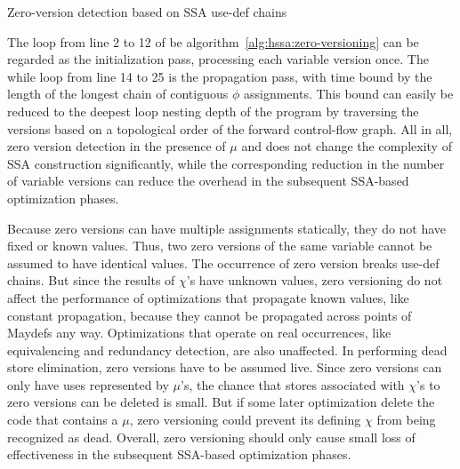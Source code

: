 \begin{algorithm}[htpb]
  \caption{\label{alg:hssa:zero-versioning}Zero-version detection based on SSA use-def chains}
\end{algorithm}

The loop from line 2 to 12 of be
algorithm~\ref{alg:hssa:zero-versioning} can be regarded as the initialization
pass, processing each variable version once.
The while loop from line 14 to 25 is the propagation pass, with time bound by
the length of the longest chain of contiguous $\phi$ assignments.
This bound can easily be reduced to the deepest loop nesting depth of the program by traversing the versions based on a topological order of the forward control-flow graph.
All in all, zero version detection in the presence of $\mu$ and \chifuns does not change the complexity of SSA construction significantly, while the corresponding reduction in the number of variable versions can reduce the overhead in the subsequent SSA-based optimization phases.

Because zero versions can have multiple assignments statically, they do not have fixed or known values.  Thus, two zero versions of the same variable cannot be assumed to have identical values.
The occurrence of zero version breaks use-def chains.  
But since the results of $\chi$'s have unknown values, zero versioning do not
affect the performance of optimizations that propagate known values, like 
constant propagation, because they cannot be propagated across points of
Maydefs any way. Optimizations that operate on real occurrences, like
equivalencing and redundancy detection, are also unaffected.  In performing
dead store elimination, zero versions have to be assumed live.  Since zero
versions can only have uses represented by $\mu$'s, the chance that stores
associated with $\chi$'s to zero versions can be deleted is small.  But if some
later optimization delete the code that contains a $\mu$, zero versioning
could prevent its defining $\chi$ from being recognized as dead.
Overall, zero versioning should only cause small loss of effectiveness in the
subsequent SSA-based optimization phases.


